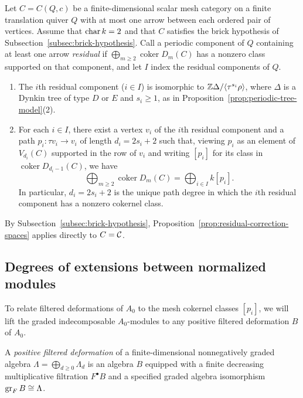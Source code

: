 \begin{proposition}
\label{prop:residual-correction-spaces}
Let $C=C(Q,c)$ be a finite-dimensional scalar mesh category on a finite
translation quiver $Q$ with at most one arrow between each ordered pair of
vertices. Assume that $\operatorname{char} k=2$ and that $C$ satisfies the brick
hypothesis of Subsection~\ref{subsec:brick-hypothesis}. Call a periodic
component of $Q$ containing at least one arrow \emph{residual} if
$\bigoplus_{m\geq2}\operatorname{coker}D_m(C)$ has a nonzero class supported
on that component, and let $I$ index the residual components of $Q$.
\begin{enumerate}[label={\upshape(\arabic*)}]
\item The $i$th residual component ($i\in I$) is isomorphic to
$\mathbb Z\Delta/\langle\tau^{s_i}\rho\rangle$, where $\Delta$ is a Dynkin tree of
type $D$ or $E$ and $s_i\geq1$, as in
Proposition~\ref{prop:periodic-tree-model}(2).
\item For each $i\in I$, there exist a vertex $v_i$ of the $i$th residual
component and a path $p_i:\tau v_i\to v_i$ of length $d_i=2s_i+2$ such that,
viewing $p_i$ as an element of $V_{d_i}(C)$ supported in the row of $v_i$
and writing $[p_i]$ for its class in $\operatorname{coker}D_{d_i-1}(C)$, we
have
\[
 \bigoplus_{m\geq2}\operatorname{coker}D_m(C)
                      =\bigoplus_{i\in I}k[p_i].
\]
In particular, $d_i=2s_i+2$ is the unique path degree in which the $i$th
residual component has a nonzero cokernel class.
\end{enumerate}
\end{proposition}

By Subsection~\ref{subsec:brick-hypothesis}, Proposition~\ref{prop:residual-correction-spaces}
applies directly to $C=\mathcal C$.

\subsection{Degrees of extensions between normalized modules}
\label{subsec:ext-degrees}

To relate filtered deformations of $A_0$ to the mesh cokernel classes
$[p_i]$, we will lift the graded indecomposable $A_0$-modules to any
positive filtered deformation $B$ of $A_0$.

\begin{definition}
\label{def:positive-deformation}
A \emph{positive filtered deformation} of a finite-dimensional nonnegatively
graded algebra $\Lambda=\bigoplus_{d\geq0}\Lambda_d$ is an algebra $B$
equipped with a finite decreasing multiplicative filtration $F^\bullet B$
and a specified graded algebra isomorphism $\operatorname{gr}_F B\cong\Lambda$.
\end{definition}

